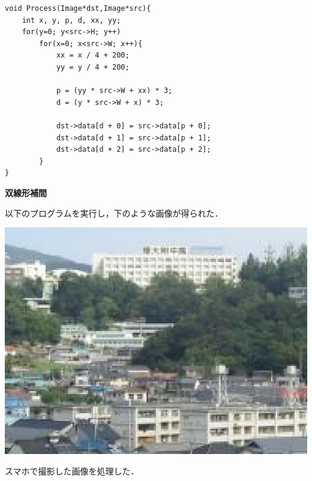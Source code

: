 \documentclass[11pt]{jarticle}
\begin{document}
\begin{lstlisting}
void Process(Image*dst,Image*src){
    int x, y, p, d, xx, yy;
    for(y=0; y<src->H; y++)
        for(x=0; x<src->W; x++){
            xx = x / 4 + 200;
            yy = y / 4 + 200;

            p = (yy * src->W + xx) * 3;
            d = (y * src->W + x) * 3;
       
            dst->data[d + 0] = src->data[p + 0];
            dst->data[d + 1] = src->data[p + 1];
            dst->data[d + 2] = src->data[p + 2];
        }
}
\end{lstlisting}


{\bf 双線形補間}

以下のプログラムを実行し，下のような画像が得られた．

\includegraphics[scale=.5]{./img/sousennkei.jpg}

スマホで撮影した画像を処理した．
\end{document}
